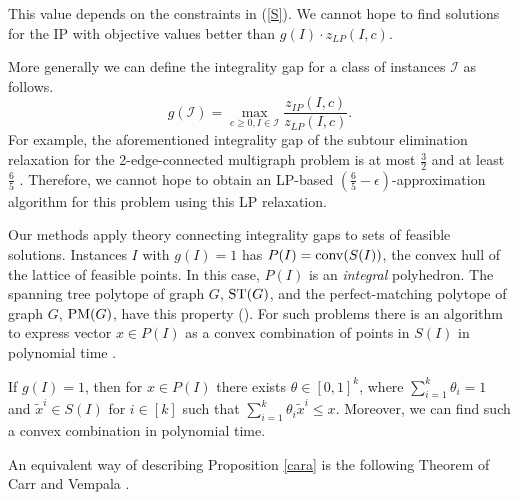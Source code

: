 This value depends on the constraints in (\ref{S}).  We cannot hope to find solutions for the IP with objective values better than $g(I)\cdot z_{LP}(I,c)$. 

More generally we can define the integrality gap for a class of instances $\mathcal{I}$ as follows.%
\begin{equation}\label{gapproblem}
g(\mathcal{I}) = \max_{c\geq 0 , I\in\mathcal{I}}\frac{z_{IP}(I,c)}{z_{LP}(I,c)}.
\end{equation}
For example, the aforementioned integrality gap of the subtour elimination relaxation for the 2-edge-connected multigraph problem is at most $\frac{3}{2}$ \cite{wolsey} and at least $\frac{6}{5}$ \cite{alexander2006integrality}. Therefore, we cannot hope to obtain an LP-based $(\frac{6}{5}-\epsilon)$-approximation algorithm for this problem using this LP relaxation.


Our methods apply theory connecting integrality gaps to sets of feasible solutions. Instances $I$ with  $g(I)=1$ has $P(I)=\operatorname{conv}(S(I))$, the convex hull of the lattice of feasible points. In this case, $P(I)$ is an \textit{integral} polyhedron. The spanning tree polytope of graph $G$, $\operatorname{ST}(G)$, and the perfect-matching polytope of graph $G$, $\operatorname{{{PM}}}(G)$, have this property (\cite{Edmonds2003,edmondsPM}). For such problems there is an algorithm to express vector $x\in P(I)$ as a convex combination of points in $S(I)$ in polynomial time \cite{cons-cara}.
\begin{proposition}\label{cara}
	If $g(I)=1$, then for $x\in P(I)$ there exists $\theta \in [0,1]^k$, where $\sum_{i=1}^{k}\theta_i =1$ and $\tilde{x}^i\in S(I)$ for $i\in [k]$ such that $\sum_{i=1}^{k}\theta_i \tilde{x}^i\leq x$. Moreover, we can find such a convex combination in polynomial time.
\end{proposition}

An equivalent way of describing Proposition \ref{cara} is the following Theorem of Carr and Vempala \cite{Carr2004}.


